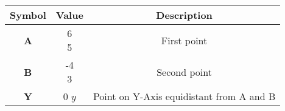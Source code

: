 \begin{tabular}[12pt]{ |c|c|c|}
    \hline
    \textbf{Symbol} & \textbf{Value} & \textbf{Description} \\
    \hline
    \textbf{A} & \myvec{6\\5} & First point\\
    \hline 
    \textbf{B} & \myvec{-4\\3} & Second point\\
    \hline
    \textbf{Y} & \myvec{0\\$y$} & Point on Y-Axis equidistant from A and B\\
    \hline
    \end{tabular}
